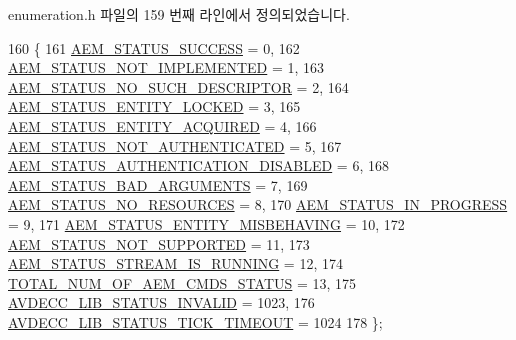 enumeration.\+h 파일의 159 번째 라인에서 정의되었습니다.


\begin{DoxyCode}
160 \{
161     \hyperlink{namespaceavdecc__lib_affd436edb2cecd20cfd784a84f852b2bac947077909cb590b84f4b5db413080e0}{AEM\_STATUS\_SUCCESS} = 0,                 
162     \hyperlink{namespaceavdecc__lib_affd436edb2cecd20cfd784a84f852b2ba1de0a38d458af43bc8965b715fd37b4f}{AEM\_STATUS\_NOT\_IMPLEMENTED} = 1,         
163     \hyperlink{namespaceavdecc__lib_affd436edb2cecd20cfd784a84f852b2ba237719786e28d0dd7af47c5d19d2f6b0}{AEM\_STATUS\_NO\_SUCH\_DESCRIPTOR} = 2,      
164     \hyperlink{namespaceavdecc__lib_affd436edb2cecd20cfd784a84f852b2ba75fd105d41f1c93ed9ccbb889cfc8903}{AEM\_STATUS\_ENTITY\_LOCKED} = 3,           
165     \hyperlink{namespaceavdecc__lib_affd436edb2cecd20cfd784a84f852b2bac29adbeb4681b7134713cb3339b25deb}{AEM\_STATUS\_ENTITY\_ACQUIRED} = 4,         
166     \hyperlink{namespaceavdecc__lib_affd436edb2cecd20cfd784a84f852b2baf7adc1da1d42de8b7dd6948c4f0007ea}{AEM\_STATUS\_NOT\_AUTHENTICATED} = 5,       
167     \hyperlink{namespaceavdecc__lib_affd436edb2cecd20cfd784a84f852b2ba340db3afdf0c9c2c6967240fd303b25f}{AEM\_STATUS\_AUTHENTICATION\_DISABLED} = 6, 
168     \hyperlink{namespaceavdecc__lib_affd436edb2cecd20cfd784a84f852b2ba5531896e514772280c48dde65165ffeb}{AEM\_STATUS\_BAD\_ARGUMENTS} = 7,           
169     \hyperlink{namespaceavdecc__lib_affd436edb2cecd20cfd784a84f852b2ba2a7bc947e3260dd5f1648ff20b643c06}{AEM\_STATUS\_NO\_RESOURCES} = 8,            
170     \hyperlink{namespaceavdecc__lib_affd436edb2cecd20cfd784a84f852b2bad181d45fa2899b885260eed6e86a350f}{AEM\_STATUS\_IN\_PROGRESS} = 9,             
171     \hyperlink{namespaceavdecc__lib_affd436edb2cecd20cfd784a84f852b2bafdedf6e0392b0ba7e66a450d39994f91}{AEM\_STATUS\_ENTITY\_MISBEHAVING} = 10,     
172     \hyperlink{namespaceavdecc__lib_affd436edb2cecd20cfd784a84f852b2ba852239737bcf152bba47fe4b8af23958}{AEM\_STATUS\_NOT\_SUPPORTED} = 11,          
173     \hyperlink{namespaceavdecc__lib_affd436edb2cecd20cfd784a84f852b2ba65a700b3657bb245338ede0e1f4e866f}{AEM\_STATUS\_STREAM\_IS\_RUNNING} = 12,      
174     \hyperlink{namespaceavdecc__lib_affd436edb2cecd20cfd784a84f852b2bacaaaf405889712cabe5a10fc46bc32b7}{TOTAL\_NUM\_OF\_AEM\_CMDS\_STATUS} = 13,      
175     \hyperlink{namespaceavdecc__lib_affd436edb2cecd20cfd784a84f852b2ba8a4a3486ee32871689aae7049d91ac0c}{AVDECC\_LIB\_STATUS\_INVALID} = 1023,       
176     \hyperlink{namespaceavdecc__lib_affd436edb2cecd20cfd784a84f852b2ba32ca2a87202e84d0727b3430e4cda056}{AVDECC\_LIB\_STATUS\_TICK\_TIMEOUT} = 1024 
178 \};
\end{DoxyCode}
